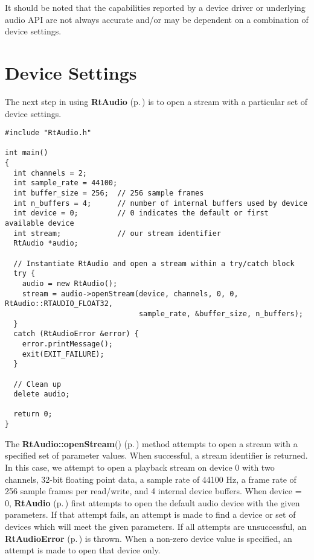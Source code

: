 It should be noted that the capabilities reported by a device driver or underlying audio API are not always accurate and/or may be dependent on a combination of device settings.

\section{Device Settings}\label{settings}


The next step in using {\bf Rt\-Audio} {\rm (p.\,\pageref{classRtAudio})} is to open a stream with a particular set of device settings.

\footnotesize\begin{verbatim}#include "RtAudio.h"

int main()
{
  int channels = 2;
  int sample_rate = 44100;
  int buffer_size = 256;  // 256 sample frames
  int n_buffers = 4;      // number of internal buffers used by device
  int device = 0;         // 0 indicates the default or first available device
  int stream;             // our stream identifier
  RtAudio *audio;

  // Instantiate RtAudio and open a stream within a try/catch block
  try {
    audio = new RtAudio();
    stream = audio->openStream(device, channels, 0, 0, RtAudio::RTAUDIO_FLOAT32,
                               sample_rate, &buffer_size, n_buffers);
  }
  catch (RtAudioError &error) {
    error.printMessage();
    exit(EXIT_FAILURE);
  }

  // Clean up
  delete audio;

  return 0;
}\end{verbatim}\normalsize 


The {\bf Rt\-Audio::open\-Stream}() {\rm (p.\,\pageref{classRtAudio_a3})} method attempts to open a stream with a specified set of parameter values. When successful, a stream identifier is returned. In this case, we attempt to open a playback stream on device 0 with two channels, 32-bit floating point data, a sample rate of 44100 Hz, a frame rate of 256 sample frames per read/write, and 4 internal device buffers. When device = 0, {\bf Rt\-Audio} {\rm (p.\,\pageref{classRtAudio})} first attempts to open the default audio device with the given parameters. If that attempt fails, an attempt is made to find a device or set of devices which will meet the given parameters. If all attempts are unsuccessful, an {\bf Rt\-Audio\-Error} {\rm (p.\,\pageref{classRtAudioError})} is thrown. When a non-zero device value is specified, an attempt is made to open that device only.

